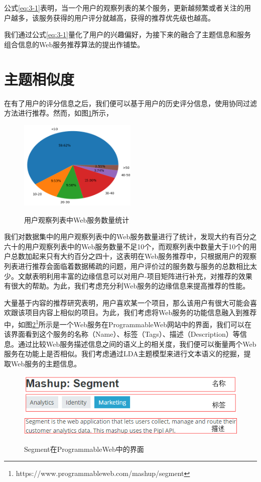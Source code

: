 \documentclass[master,winfonts]{njuthesis}
\begin{document}
公式\eqref{eq:3-1}表明，当一个用户的观察列表的某个服务，更新越频繁或者关注的用户越多，该服务获得的用户评分就越高，获得的推荐优先级也越高。

我们通过公式\eqref{eq:3-1}量化了用户的兴趣偏好，为接下来的融合了主题信息和服务组合信息的Web服务推荐算法的提出作铺垫。
\section{主题相似度}
在有了用户的评分信息之后，我们便可以基于用户的历史评分信息，使用协同过滤方法进行推荐。然而，如图\ref{fig:8}所示，
\begin{figure}[htbp]
  \centering
  \includegraphics[width=0.5\textwidth]{pie.png}\\
  \caption{用户观察列表中Web服务数量统计}\label{fig:8}
\end{figure}
我们对数据集中的用户观察列表中的Web服务数量进行了统计，发现大约有百分之六十的用户观察列表中的Web服务数量不足10个，而观察列表中数量大于10个的用户总数加起来只有大约百分之四十，这表明在Web服务推荐中，只根据用户的观察列表进行推荐会面临着数据稀疏的问题，用户评价过的服务数与服务的总数相比太少。文献\cite{DBLP:journals/csur/ShiLH14}表明利用丰富的边缘信息可以对用户-项目矩阵进行补充，对推荐的效果有很大的帮助。为此，我们考虑充分利Web服务的边缘信息来提高推荐的性能。

大量基于内容\cite{Basu1998Recommendation,Jiang2014An,Wang2006An}的推荐研究表明，用户喜欢某一个项目，那么该用户有很大可能会喜欢跟该项目内容上相似的项目。为此，我们考虑将Web服务的功能信息融入到推荐中，如图\ref{fig:9}\footnote{https://www.programmableweb.com/mashup/segment}所示是一个Web服务在ProgrammableWeb网站中的界面，我们可以在该界面看到这个服务的名称（Name）、标签（Tags）、描述（Description）等信息。通过比较Web服务描述信息之间的语义上的相关度，我们便可以衡量两个Web服务在功能上是否相似。我们考虑通过LDA主题模型来进行文本语义的挖掘，提取Web服务的主题信息。
\begin{figure}[htbp]
  \centering
  \includegraphics[width=\textwidth]{Segment.png}\\
  \caption{Segment在ProgrammableWeb中的界面}\label{fig:9}
\end{figure}
\end{document}
